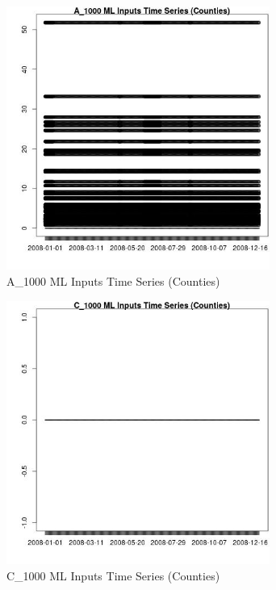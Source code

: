 \begin{figure} 
\centering  
\includegraphics[width=0.77\textwidth]{Code_Outputs/ML_input_report_ML_input_CountyGeometricCentroids_Locations_Dates_part_c_2008-01-01to2008-12-31_A_1000TS.jpg} 
\caption{\label{fig:ML_input_report_ML_input_CountyGeometricCentroids_Locations_Dates_part_c_2008-01-01to2008-12-31A_1000TS}A_1000 ML Inputs Time Series (Counties)} 
\end{figure} 
 

\begin{figure} 
\centering  
\includegraphics[width=0.77\textwidth]{Code_Outputs/ML_input_report_ML_input_CountyGeometricCentroids_Locations_Dates_part_c_2008-01-01to2008-12-31_C_1000TS.jpg} 
\caption{\label{fig:ML_input_report_ML_input_CountyGeometricCentroids_Locations_Dates_part_c_2008-01-01to2008-12-31C_1000TS}C_1000 ML Inputs Time Series (Counties)} 
\end{figure} 
 

